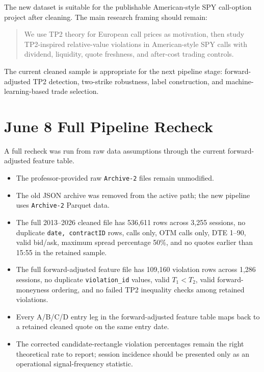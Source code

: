 \documentclass[11pt]{article}
\begin{document}
The new dataset is suitable for the publishable American-style SPY call-option
project after cleaning. The main research framing should remain:

\begin{quote}
We use TP2 theory for European call prices as motivation, then study
TP2-inspired relative-value violations in American-style SPY calls with
dividend, liquidity, quote freshness, and after-cost trading controls.
\end{quote}

The current cleaned sample is appropriate for the next pipeline stage:
forward-adjusted TP2 detection, two-strike robustness, label construction, and
machine-learning-based trade selection.

\section*{June 8 Full Pipeline Recheck}

A full recheck was run from raw data assumptions through the current
forward-adjusted feature table.

\begin{itemize}
  \item The professor-provided raw \texttt{Archive-2} files remain unmodified.
  \item The old JSON archive was removed from the active path; the new pipeline
  uses \texttt{Archive-2} Parquet data.
  \item The full 2013--2026 cleaned file has 536,611 rows across 3,255 sessions,
  no duplicate \texttt{date, contractID} rows, calls only, OTM calls only, DTE
  1--90, valid bid/ask, maximum spread percentage 50\%, and no quotes earlier
  than 15:55 in the retained sample.
  \item The full forward-adjusted feature file has 109,160 violation rows across
  1,286 sessions, no duplicate \texttt{violation\_id} values, valid
  $T_1<T_2$, valid forward-moneyness ordering, and no failed TP2 inequality
  checks among retained violations.
  \item Every A/B/C/D entry leg in the forward-adjusted feature table maps back
  to a retained cleaned quote on the same entry date.
  \item The corrected candidate-rectangle violation percentages remain the
  right theoretical rate to report; session incidence should be presented only
  as an operational signal-frequency statistic.
\end{itemize}
\end{document}
